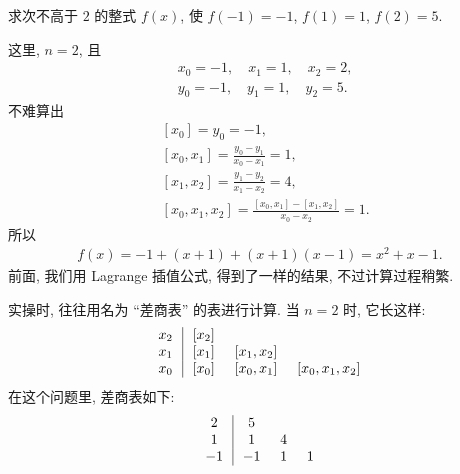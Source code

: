 \begin{example}
    求次不高于 $2$ 的整式 $f(x)$, 使 $f(-1)=-1$, $f(1)=1$, $f(2)=5$.

    这里, $n = 2$, 且
    \begin{align*}
         & x_0 = -1, \quad x_1 = 1, \quad x_2 = 2, \\
         & y_0 = -1, \quad y_1 = 1, \quad y_2 = 5.
    \end{align*}
    不难算出
    \begin{align*}
         & [x_0] = y_0 = -1,                                \\
         & [x_0, x_1] = \frac{y_0 - y_1}{x_0 - x_1}
        = 1,                                                \\
         & [x_1, x_2] = \frac{y_1 - y_2}{x_1 - x_2}
        = 4,                                                \\
         & [x_0, x_1, x_2] = \frac{[x_0, x_1] - [x_1, x_2]}
        {x_0 - x_2} = 1.
    \end{align*}
    所以
    \begin{align*}
        f(x) = -1 + (x + 1) + (x + 1)(x - 1) = x^2 + x - 1.
    \end{align*}
    前面, 我们用 Lagrange 插值公式, 得到了一样的结果, 不过计算过程稍繁.

    实操时, 往往用名为 ``差商表'' 的表进行计算. 当 $n = 2$ 时, 它长这样:
    \begin{align*}
        \arraycolsep=0.25cm
        \begin{array}{c|ccc}
            x_2 & [x_2] & \          & \               \\
            x_1 & [x_1] & [x_1, x_2] & \               \\
            x_0 & [x_0] & [x_0, x_1] & [x_0, x_1, x_2] \\
        \end{array}
    \end{align*}
    在这个问题里, 差商表如下:
    \begin{align*}
        \arraycolsep=0.25cm
        \begin{array}{c|ccc}
            2  & 5  & \  & \ \\
            1  & 1  & 4  & \ \\
            -1 & -1 & 1  & 1 \\
        \end{array}
    \end{align*}
\end{example}

